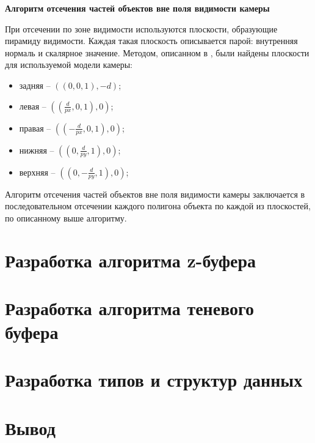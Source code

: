 \textbf{Алгоритм отсечения частей объектов вне поля видимости камеры}

При отсечении по зоне видимости используются плоскости, образующие пирамиду видимости. Каждая такая плоскость описывается парой: внутренняя нормаль и скалярное значение. Методом, описанном в \cite{gabriella}, были найдены плоскости для используемой модели камеры:
	
\begin{itemize}
	\item задняя -- $((0, 0, 1), -d)$;
	\item левая -- $((\frac{d}{px}, 0, 1), 0)$;
	\item правая -- $((-\frac{d}{px}, 0, 1), 0)$;
	\item нижняя -- $((0, \frac{d}{py}, 1), 0)$;
	\item верхняя -- $((0, -\frac{d}{py}, 1), 0)$;
\end{itemize}

Алгоритм отсечения частей объектов вне поля видимости камеры заключается в последовательном отсечении каждого полигона объекта по каждой из плоскостей, по описанному выше алгоритму.


\section{Разработка алгоритма z-буфера}

\section{Разработка алгоритма теневого буфера}

\section{Разработка типов и структур данных}

\section*{Вывод}

\clearpage
